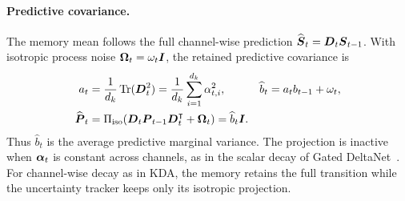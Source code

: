 \documentclass{article} %
\begin{document}
\paragraph{Predictive covariance.}
The memory mean follows the full channel-wise prediction
$\widehat{\boldsymbol{S}}_t=\boldsymbol{D}_t\boldsymbol{S}_{t-1}$. With isotropic process noise
$\boldsymbol{\Omega}_t=\omega_t\boldsymbol{I}$, the retained predictive covariance is
\begin{equation}
\begin{aligned}
  a_t
  &=\frac{1}{d_k}\operatorname{Tr}(\boldsymbol{D}_t^2)
   =\frac{1}{d_k}\sum_{i=1}^{d_k}\alpha_{t,i}^2,
  &
  \widehat b_t
  &=a_tb_{t-1}+\omega_t,
  \\
  \widehat{\boldsymbol{P}}_t
  &=\Pi_{\mathrm{iso}}\!\left(
      \boldsymbol{D}_t\boldsymbol{P}_{t-1}\boldsymbol{D}_t^{\intercal}+\boldsymbol{\Omega}_t
    \right)
   =\widehat b_t\boldsymbol{I}.
\end{aligned}
  \label{eq:iso-kla-predict}
\end{equation}
Thus $\widehat b_t$ is the average predictive marginal variance. The projection is inactive when
$\boldsymbol{\alpha}_t$ is constant across channels, as in the scalar decay of Gated
DeltaNet~\citep{yang2024gdn}. For channel-wise decay as in KDA, the memory retains the full
transition while the uncertainty tracker keeps only its isotropic projection.
\end{document}
